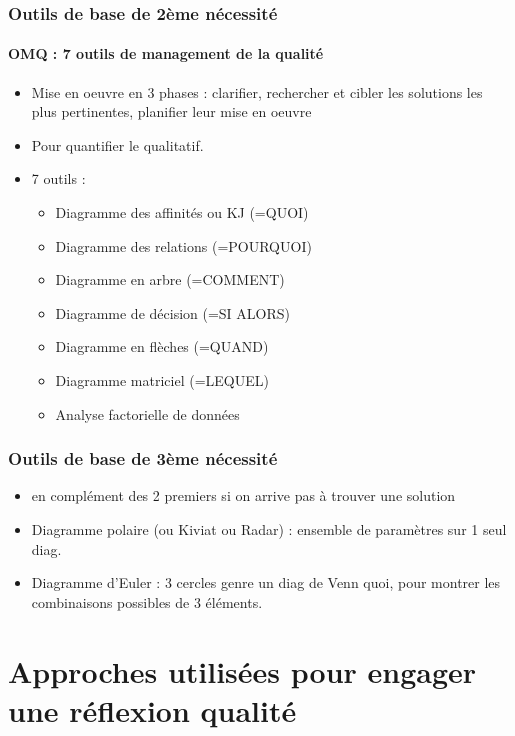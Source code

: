 			\subsubsection{Outils de base de 2ème nécessité}
				\paragraph{OMQ : 7 outils de management de la qualité}
				\begin{itemize}
				\item Mise en oeuvre en 3 phases : clarifier, rechercher et cibler les solutions les plus pertinentes, planifier leur mise en oeuvre
				\item Pour quantifier le qualitatif. 
				\item 7 outils : 
					\begin{itemize}
					\item Diagramme des affinités ou KJ (=QUOI)
					\item Diagramme des relations (=POURQUOI)
					\item Diagramme en arbre (=COMMENT)
					\item Diagramme de décision (=SI ALORS) 
					\item Diagramme en flèches (=QUAND) 
					\item Diagramme matriciel (=LEQUEL)
					\item Analyse factorielle de données
					\end{itemize}
				\end{itemize}
			\subsubsection{Outils de base de 3ème nécessité}
				\begin{itemize}
				\item en complément des 2 premiers si on arrive pas à trouver une solution 
				\item Diagramme polaire (ou Kiviat ou Radar) : ensemble de paramètres sur 1 seul diag. 
				\item Diagramme d'Euler : 3 cercles genre un diag de Venn quoi, pour montrer les combinaisons possibles de 3 éléments. 
				\end{itemize}
					
	
	\section{Approches utilisées pour engager une réflexion qualité}
